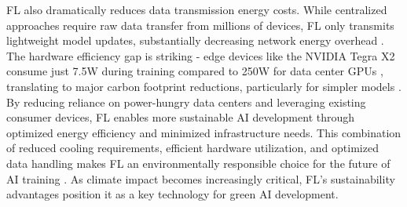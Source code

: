 FL also dramatically reduces data transmission energy costs. While centralized approaches require raw data transfer from millions of devices, FL only transmits lightweight model updates, substantially decreasing network energy overhead \cite{fl_data_transmission}. The hardware efficiency gap is striking - edge devices like the NVIDIA Tegra X2 consume just 7.5W during training compared to 250W for data center GPUs \cite{hardware_power}, translating to major carbon footprint reductions, particularly for simpler models \cite{fl_iid}.
By reducing reliance on power-hungry data centers and leveraging existing consumer devices, FL enables more sustainable AI development through optimized energy efficiency and minimized infrastructure needs. This combination of reduced cooling requirements, efficient hardware utilization, and optimized data handling makes FL an environmentally responsible choice for the future of AI training \cite{fl_environmental}. As climate impact becomes increasingly critical, FL's sustainability advantages position it as a key technology for green AI development.
